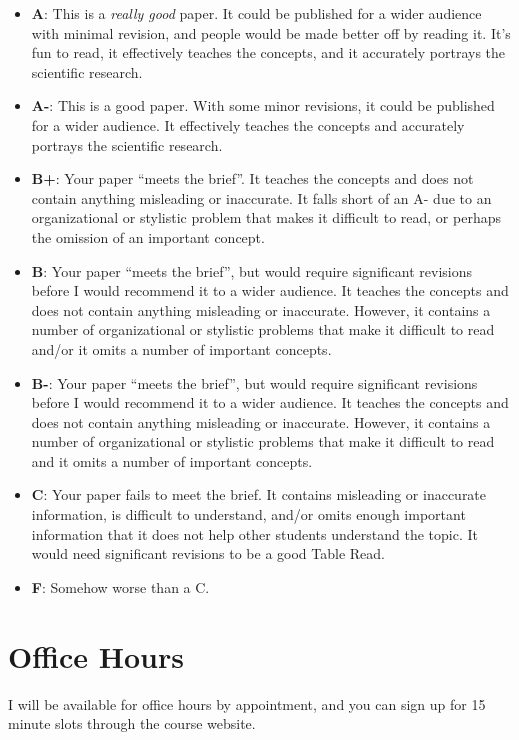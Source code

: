\documentclass[11pt, letterpaper]{article}
\begin{document}
\begin{itemize}
	\item \textbf{A}: This is a \textit{really good} paper. It could be published for a wider audience with minimal revision, and people would be made better off by reading it. It's fun to read, it effectively teaches the concepts, and it accurately portrays the scientific research.
	\item \textbf{A-}: This is a good paper. With some minor revisions, it could be published for a wider audience. It effectively teaches the concepts and accurately portrays the scientific research. 
	\item \textbf{B+}: Your paper ``meets the brief''. It teaches the concepts and does not contain anything misleading or inaccurate. It falls short of an A- due to an organizational or stylistic problem that makes it difficult to read, or perhaps the omission of an important concept.
	\item \textbf{B}: Your paper ``meets the brief'', but would require significant revisions before I would recommend it to a wider audience. It teaches the concepts and does not contain anything misleading or inaccurate. However, it contains a number of organizational or stylistic problems that make it difficult to read and/or it omits a number of important concepts.
	\item \textbf{B-}: Your paper ``meets the brief'', but would require significant revisions before I would recommend it to a wider audience. It teaches the concepts and does not contain anything misleading or inaccurate. However, it contains a number of organizational or stylistic problems that make it difficult to read and it omits a number of important concepts.
	\item \textbf{C}: Your paper fails to meet the brief. It contains misleading or inaccurate information, is difficult to understand, and/or omits enough important information that it does not help other students understand the topic. It would need significant revisions to be a good Table Read.
	\item \textbf{F}: Somehow worse than a C.
\end{itemize}


\section*{Office Hours}

I will be available for office hours by appointment, and you can sign up for 15 minute slots through the course website.
\end{document}
